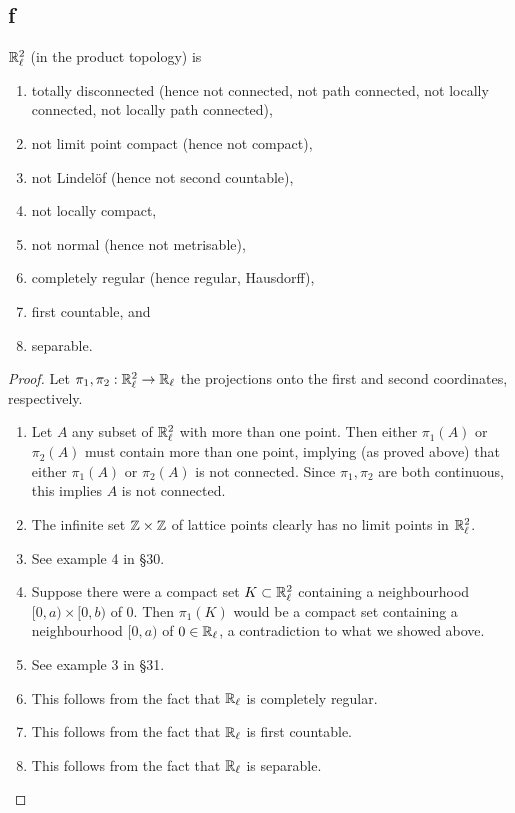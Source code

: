 \subsection*{f}
  $\mathbb{R}_\ell^2$ (in the product topology) is
  \begin{enumerate}
  \item totally disconnected (hence not connected, not path connected, not locally connected, not locally path connected),
  \item not limit point compact (hence not compact),
  \item not Lindel\"of (hence not second countable),
  \item not locally compact,
  \item not normal (hence not metrisable),
  \item completely regular (hence regular, Hausdorff),
  \item first countable, and
  \item separable.
  \end{enumerate}

\begin{proof}
   Let $\pi_1,\pi_2 : \mathbb{R}_\ell^2 \to \mathbb{R}_\ell$ the projections onto the first and second coordinates, respectively.
  \begin{enumerate}[leftmargin=*]
  \item Let $A$ any subset of $\mathbb{R}_\ell^2$ with more than one point. Then either $\pi_1(A)$ or $\pi_2(A)$ must contain more than one point, implying (as proved above) that either $\pi_1(A)$ or $\pi_2(A)$ is not connected. Since $\pi_1,\pi_2$ are both continuous, this implies $A$ is not connected.
  \item The infinite set $\mathbb{Z} \times \mathbb{Z}$ of lattice points clearly has no limit points in $\mathbb{R}_\ell^2$.
  \item See example 4 in \S 30.
  \item Suppose there were a compact set $K \subset \mathbb{R}_\ell^2$ containing a neighbourhood $[0, a) \times [0, b)$ of $0$. Then $\pi_1(K)$ would be a compact set containing a neighbourhood $[0, a)$ of $0 \in \mathbb{R}_\ell$, a contradiction to what we showed above.
  \item See example 3 in \S 31.
  \item This follows from the fact that $\mathbb{R}_\ell$ is completely regular.
  \item This follows from the fact that $\mathbb{R}_\ell$ is first countable.
  \item This follows from the fact that $\mathbb{R}_\ell$ is separable. \qedhere
  \end{enumerate}
\end{proof}

